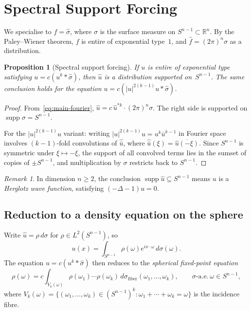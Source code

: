 \documentclass[12pt]{article}
\newtheorem{proposition}[theorem]{Proposition}
\theoremstyle{definition}
\theoremstyle{remark}
\newtheorem{remark}[theorem]{Remark}
\DeclareMathOperator{\supp}{supp}
\newcommand{\R}{\mathbb{R}}
\newcommand{\wh}{\widehat}
\begin{document}
\section{Spectral Support Forcing}
\label{sec:spectral-forcing}

We specialise to $f=\wh\sigma$, where $\sigma$ is the surface measure on
$S^{n-1}\subset\R^n$.  By the Paley--Wiener theorem, $f$ is entire of
exponential type~$1$, and $\wh f=(2\pi)^n\sigma$ as a distribution.

\begin{proposition}[Spectral support forcing]
  \label{prop:support-forcing}
  If $u$ is entire of exponential type satisfying $u=c(u^k\ast\wh\sigma)$,
  then $\wh u$ is a distribution supported on~$S^{n-1}$.
  The same conclusion holds for the equation $u=c(|u|^{2(k-1)}u\ast\wh\sigma)$.
\end{proposition}

\begin{proof}
  From~\eqref{eq:main-fourier}, $\wh u=c\,\wh u^{\ast k}\cdot(2\pi)^n\sigma$.
  The right side is supported on $\supp\sigma=S^{n-1}$.

  For the $|u|^{2(k-1)}u$ variant: writing $|u|^{2(k-1)}u=u^k\bar u^{k-1}$
  in Fourier space involves $(k-1)$-fold convolutions of $\wh{\bar u}$, where
  $\wh{\bar u}(\xi)=\overline{\wh u(-\xi)}$.  Since $S^{n-1}$ is symmetric
  under $\xi\mapsto-\xi$, the support of all convolved terms lies in the
  sumset of copies of $\pm S^{n-1}$, and multiplication by $\sigma$ restricts
  back to $S^{n-1}$.
\end{proof}

\begin{remark}
  In dimension $n\geq 2$, the conclusion $\supp\wh u\subseteq S^{n-1}$ means
  $u$ is a \emph{Herglotz wave function}, satisfying $(-\Delta-1)u=0$.
\end{remark}

\subsection{Reduction to a density equation on the sphere}

Write $\wh u=\rho\,d\sigma$ for $\rho\in L^2(S^{n-1})$, so
\[
  u(x) = \int_{S^{n-1}}\rho(\omega)e^{ix\cdot\omega}\,d\sigma(\omega).
\]
The equation $u=c(u^k\ast\wh\sigma)$ then reduces to the
\emph{spherical fixed-point equation}
\begin{equation}  \label{eq:sphere-eq}
  \rho(\omega) = c\int_{V_k(\omega)}\rho(\omega_1)\cdots\rho(\omega_k)
    \,d\sigma_{\mathrm{fiber}}(\omega_1,\ldots,\omega_k),
  \qquad \sigma\text{-a.e.}\ \omega\in S^{n-1},
\end{equation}
where $V_k(\omega)=\{(\omega_1,\ldots,\omega_k)\in(S^{n-1})^k:
\omega_1+\cdots+\omega_k=\omega\}$ is the incidence fibre.
\end{document}
